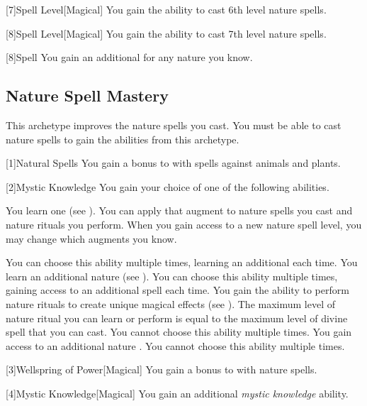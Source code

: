         [7]{Spell Level}[Magical] You gain the ability to cast 6th level nature spells.

        [8]{Spell Level}[Magical] You gain the ability to cast 7th level nature spells.

        [8]{Spell} You gain an additional  for any nature  you know.

    \subsection{Nature Spell Mastery}
        This archetype improves the nature spells you cast.
        You must be able to cast nature spells to gain the abilities from this archetype.

        [1]{Natural Spells} You gain a  bonus to  with spells against animals and plants.

        [2]{Mystic Knowledge}
        You gain your choice of one of the following abilities.
        {
             You learn one  (see ).
                You can apply that augment to nature spells you cast and nature rituals you perform.
                When you gain access to a new nature spell level, you may change which augments you know.
                \par You can choose this ability multiple times, learning an additional  each time.
             You learn an additional nature  (see ).
                You can choose this ability multiple times, gaining access to an additional spell each time.
             You gain the ability to perform nature rituals to create unique magical effects (see ).
                The maximum level of nature ritual you can learn or perform is equal to the maximum level of divine spell that you can cast.
                You cannot choose this ability multiple times.
             You gain access to an additional nature .
                You cannot choose this ability multiple times.
        }

        [3]{Wellspring of Power}[Magical]
        You gain a  bonus to  with nature spells.

        [4]{Mystic Knowledge}[Magical]
        You gain an additional \textit{mystic knowledge} ability.

